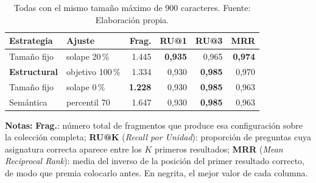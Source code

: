 \begin{table}[htbp]
  \centering
  \caption[Las tres estrategias de fragmentación a igualdad de tamaño]{Todas con el mismo tamaño máximo de 900 caracteres. Fuente: Elaboración propia.}
  \label{tab:rejilla_fragmentacion}
  \small
  \begin{tabular}{@{}llrrrr@{}}
    \toprule
    \textbf{Estrategia}  & \textbf{Ajuste} & \textbf{Frag.} & \textbf{RU@1}  & \textbf{RU@3}  & \textbf{MRR}   \\
    \midrule
    Tamaño fijo          & solape 20\,\%    & 1.445          & \textbf{0,935} & 0,965          & \textbf{0,974} \\
    \textbf{Estructural} & objetivo 100\,\% & 1.334          & 0,930          & \textbf{0,985} & 0,970          \\
    Tamaño fijo          & solape 0\,\%     & \textbf{1.228} & 0,930          & \textbf{0,985} & 0,963          \\
    Semántica            & percentil 70    & 1.647          & 0,930          & \textbf{0,985} & 0,963          \\
    \bottomrule
  \end{tabular}
  \begin{minipage}{0.95\textwidth}
    \vspace{4pt}
    \tiny
    \textbf{Notas:} \textbf{Frag.}: número total de fragmentos que produce esa configuración
    sobre la colección completa; \textbf{RU@K} (\textit{Recall por Unidad}): proporción de
    preguntas cuya asignatura correcta aparece entre los $K$ primeros resultados;
    \textbf{MRR} (\textit{Mean Reciprocal Rank}): media del inverso de la posición del primer
    resultado correcto, de modo que premia colocarlo antes. En negrita, el mejor valor de cada columna.
  \end{minipage}
\end{table}
